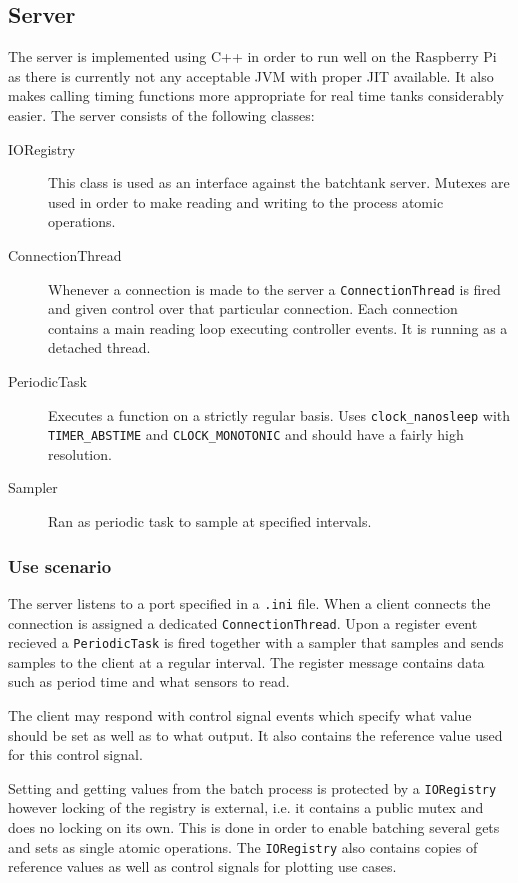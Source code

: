 \documentclass{article}
\begin{document}
\subsection{Server}
The server is implemented using C++ in order to run well on the Raspberry Pi as
there is currently not any acceptable JVM with proper JIT available. It
also makes calling timing functions more appropriate for real time tanks
considerably easier. The server consists of the following classes:

\begin{description}
\item[IORegistry]
  This class is used as an interface against the batchtank server.
  Mutexes are used in order to make reading and writing to the process
  atomic operations.

\item[ConnectionThread]
  Whenever a connection is made to the server a \verb+ConnectionThread+
  is fired and given control over that particular connection. Each
  connection contains a main reading loop executing controller events.
  It is running as a detached thread.

\item[PeriodicTask]
  Executes a function on a strictly regular basis. Uses
  \verb+clock_nanosleep+  with \verb+TIMER_ABSTIME+ and
  \verb+CLOCK_MONOTONIC+ and should have a fairly high resolution.

\item[Sampler]
  Ran as periodic task to sample at specified intervals.
\end{description}

\subsubsection{Use scenario}
The server listens to a port specified in a \verb+.ini+ file. When a client
connects the connection is assigned a dedicated \verb+ConnectionThread+. 
Upon a register event recieved a \verb+PeriodicTask+ is fired together
with a sampler that samples and sends samples to the client at a regular
interval. The register message contains data such as period time and
what sensors to read.

The client may respond with control signal events which specify what
value should be set as well as to what output. It also contains the
reference value used for this control signal.

Setting and getting values from the batch process is protected by a
\verb+IORegistry+ however locking of the registry is external, i.e. it
contains a public mutex and does no locking on its own. This is done in
order to enable batching several gets and sets as single atomic
operations. The \verb+IORegistry+ also contains copies of reference
values as well as control signals for plotting use cases.
\end{document}
